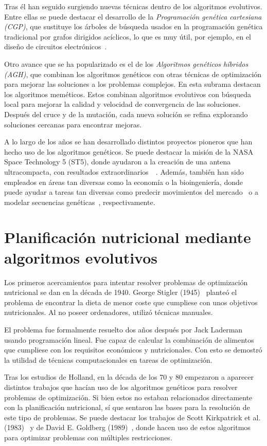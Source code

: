 Tras él han seguido surgiendo nuevas técnicas dentro de los algoritmos evolutivos. Entre ellas se puede destacar el desarrollo de la \textit{Programación genética cartesiana (CGP)}, que sustituye los árboles de búsqueda usados en la programación genética tradicional por grafos dirigidos acíclicos, lo que es muy útil, por ejemplo, en el diseño de circuitos electrónicos~\cite{miller1997}.

Otro avance que se ha popularizado es el de los \textit{Algoritmos genéticos híbridos (AGH)}, que combinan los algoritmos genéticos con otras técnicas de optimización para mejorar las soluciones a los problemas complejos. En esta subrama destacan los algoritmos meméticos. Estos combinan algoritmos evolutivos con búsqueda local para mejorar la calidad y velocidad de convergencia de las soluciones. Después del cruce y de la mutación, cada nueva solución se refina explorando soluciones cercanas para encontrar mejoras.~\cite{moscato2003}

A lo largo de los años se han desarrollado distintos proyectos pioneros que han hecho uso de los algoritmos genéticos. Se puede destacar la misión de la NASA Space Technology 5 (ST5), donde ayudaron a la creación de una antena ultracompacta, con resultados extraordinarios~\cite{NASA2006}~\cite{Lohn2004}. Además, también han sido empleados en áreas tan diversas como la economía o la bioingeniería, donde puede ayudar a tareas tan diversas como predecir movimientos del mercado~\cite{Abraham2022} o a modelar secuencias genéticas~\cite{notredame1996}, respectivamente.


\section{Planificación nutricional mediante algoritmos evolutivos}

Los primeros acercamientos para intentar resolver problemas de optimización nutricional se dan en la década de 1940. George Stigler (1945)~\cite{stigler1945} planteó el problema de encontrar la dieta de menor coste que cumpliese con unos objetivos nutricionales. Al no poseer ordenadores, utilizó técnicas manuales.

El problema fue formalmente resuelto dos años después por Jack Laderman usando programación lineal. Fue capaz de calcular la combinación de alimentos que cumpliese con los requisitos económicos y nutricionales. Con esto se demostró la utilidad de técnicas computacionales en tareas de optimización.

Tras los estudios de Holland, en la década de los 70 y 80 empezaron a aparecer distintos trabajos que hacían uso de los algoritmos genéticos para resolver problemas de optimización. Si bien estos no estaban relacionados directamente con la planificación nutricional, sí que sentaron las bases para la resolución de este tipo de problemas. Se puede destacar los trabajos de Scott Kirkpatrick et al. (1983)~\cite{kirkpatrick1983} y de David E. Goldberg (1989)~\cite{goldberg1989}, donde hacen uso de estos algoritmos para optimizar problemas con múltiples restricciones.

